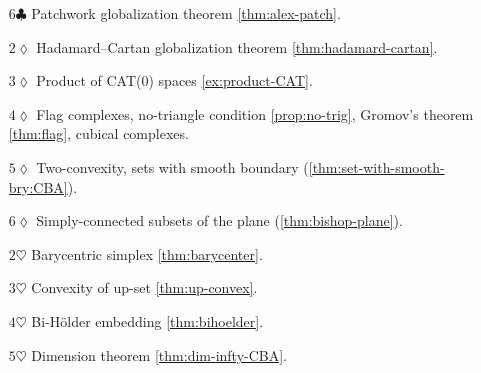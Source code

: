 \begin{itemize}
\vskip1.1mm
\item[$6\clubsuit$] Patchwork globalization theorem \ref{thm:alex-patch}.
\vskip1.1mm
\item[$2\lozenge$] Hadamard--Cartan globalization theorem \ref{thm:hadamard-cartan}.
\vskip1.1mm
\item[$3\lozenge$] Product of CAT(0) spaces \ref{ex:product-CAT}.
\vskip1.1mm
\item[$4\lozenge$] Flag complexes, no-triangle condition \ref{prop:no-trig}, Gromov's theorem \ref{thm:flag}, cubical complexes.
\vskip1.1mm
\item[$5\lozenge$] Two-convexity, sets with smooth boundary (\ref{thm:set-with-smooth-bry:CBA}).
\vskip1.1mm
\item[$6\lozenge$] Simply-connected subsets of the plane (\ref{thm:bishop-plane}).
\vskip1.1mm
\item[$2\heartsuit$] Barycentric simplex \ref{thm:barycenter}.
\vskip1.1mm
\item[$3\heartsuit$] Convexity of up-set \ref{thm:up-convex}.
\vskip1.1mm
\item[$4\heartsuit$] Bi-H\"older embedding \ref{thm:bihoelder}.
\vskip1.1mm
\item[$5\heartsuit$] Dimension theorem \ref{thm:dim-infty-CBA}.
\end{itemize}

